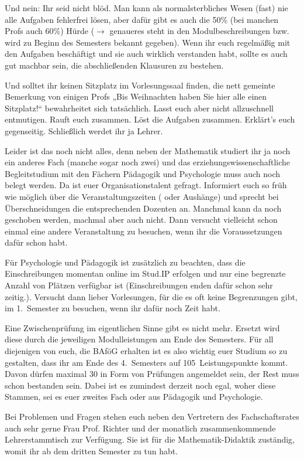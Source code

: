 Und nein: Ihr seid nicht blöd.
Man kann als normalsterbliches Wesen (fast) nie alle Aufgaben fehlerfrei lösen, aber dafür gibt es auch die 50\% (bei manchen Profs auch 60\%) Hürde ($\rightarrow$  genaueres steht in den Modulbeschreibungen bzw. wird zu Beginn des Semesters bekannt gegeben).
Wenn ihr euch regelmäßig mit den Aufgaben beschäftigt und sie auch wirklich verstanden habt, sollte es auch gut machbar sein, die abschließenden Klausuren zu bestehen.

Und solltet ihr keinen Sitzplatz im Vorlesungssaal finden, die nett gemeinte Bemerkung von einigen Profs „Bis Weihnachten haben Sie hier alle einen Sitzplatz!“ bewahrheitet sich tatsächlich.
Lasst euch aber nicht allzuschnell entmutigen.
Rauft euch zusammen.
Löst die Aufgaben zusammen.
Erklärt’s euch gegenseitig.
Schließlich werdet ihr ja Lehrer.

Leider ist das noch nicht alles, denn neben der Mathematik studiert ihr ja noch ein anderes Fach (manche sogar noch zwei) und das erziehungswissenschaftliche Begleitstudium mit den Fächern Pädagogik und Psychologie muss auch noch belegt werden.
Da ist euer Organisationstalent gefragt.
Informiert euch so früh wie möglich über die Veranstaltungszeiten ( oder Aushänge) und sprecht bei Überschneidungen die entsprechenden Dozenten an.
Manchmal kann da noch geschoben werden, machmal aber auch nicht.
Dann versucht vielleicht schon einmal eine andere Veranstaltung zu besuchen, wenn ihr die Voraussetzungen dafür schon habt.

Für Psychologie und Pädagogik ist zusätzlich zu beachten, dass die Einschreibungen momentan online im Stud.IP erfolgen und nur eine begrenzte Anzahl von Plätzen verfügbar ist (Einschreibungen enden dafür schon sehr zeitig.).
Versucht dann lieber Vorlesungen, für die es oft keine Begrenzungen gibt, im 1.~Semester zu besuchen, wenn ihr dafür noch Zeit habt.

Eine Zwischenprüfung im eigentlichen Sinne gibt es nicht mehr.
Ersetzt wird diese durch die jeweiligen Modulleistungen am Ende des Semesters.
Für all diejenigen von euch, die BAföG erhalten ist es also wichtig euer Studium so zu gestalten, dass ihr am Ende des 4.~Semesters auf 105~Leistungspunkte kommt.
Davon dürfen maximal 30 in Form von Prüfungen angemeldet sein, der Rest muss schon bestanden sein.
Dabei ist es zumindest derzeit noch egal, woher diese Stammen, sei es euer zweites Fach oder aus Pädagogik und Psychologie.

Bei Problemen und Fragen stehen euch neben den Vertretern des Fachschaftsrates auch sehr gerne Frau Prof. Richter und der monatlich zusammenkommende Lehrerstammtisch zur Verfügung.
Sie ist für die Mathematik-Didaktik zuständig, womit ihr ab dem dritten Semester zu tun habt.

